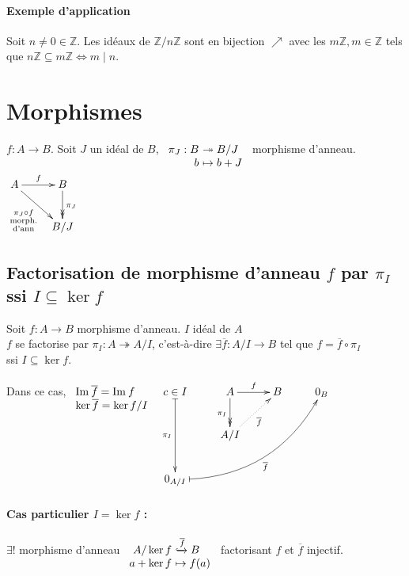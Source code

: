 \documentclass[reqno,a4paper,10pt]{report}
\newcommand{\im}{\mathrm{Im}\:} %
\newcommand{\IZ}{\ensuremath{\mathbb{Z}}\xspace} %
\newcommand{\surj}{\twoheadrightarrow}
\begin{document}
\paragraph{Exemple d'application}
Soit $n\neq 0 \in \IZ$. Les idéaux de $\IZ/n\IZ$ sont en bijection $\nearrow$
avec les $m\IZ, m \in \IZ$ tels que $n\IZ \subseteq m\IZ \iff m \mid n$.

\section{Morphismes}
$f : A \to B$. Soit $J$ un idéal de $B$, $\begin{array}[t]{r@{\ }l}
  \pi_J : B &\surj B/J\\
  b &\mapsto b+ J
\end{array}$ morphisme d'anneau. $\xymatrix{
A \ar[dr]_{\substack{\pi_J \circ f\\ \text{morph.}\\ \text{d'ann}}}
\ar[r]^f & B \ar@{->>}[d]^{\pi_J}\\
  & B/J
}$

\subsection{Factorisation de morphisme d'anneau $f$ par $\pi_I$ ssi $I
\subseteq \ker f$}
Soit $f:A\to B$ morphisme d'anneau. $I$ idéal de $A$\\
$f$ se factorise par $\pi_I:A\surj A/I$, c'est-à-dire $\exists
\overline{f}:A/I \to B$ tel que $f=\overline f \circ \pi_I$\\
ssi $I\subseteq \ker f$.

Dans ce cas, $
\begin{array}[t]{l}
  \im \overline{f}= \im f\\
  \ker \overline f = \ker f / I
\end{array}$\hspace{4.2em}
$\xymatrix{
  c\in I\ar@{|->}[dd]_{\pi_I} &A \ar[r]^f \ar@{->>}[d]_{\pi_I} & B & 0_B\\
  &A/I \ar@{.>}[ur]_{\overline{f}} &\\
  0_{A/I} \ar@/_2pc/@{|->}[uurrr]_{\overline f}
}$
\paragraph{Cas particulier $I=\ker f$ :}
$\exists !$ morphisme d'anneau $\begin{array}[t]{r@{\ }l}
  A/\ker f &\xhookrightarrow{\overline f} B \\
  a+ \ker f &\mapsto f(a)
\end{array}$ factorisant $f$ et $\overline f$ injectif.
\end{document}
